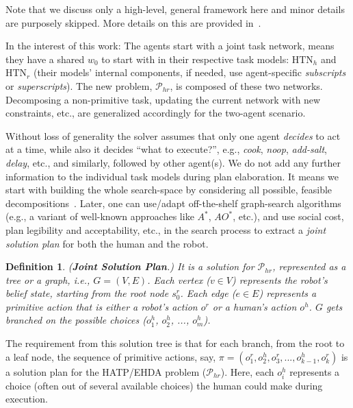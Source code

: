 \documentclass[letterpaper]{article} %
\newtheorem{definition}{Definition}
\begin{document}
Note that we discuss only a high-level, general framework here and minor details are purposely skipped. 
More details on this are provided in~\cite{thesisBuisan21,buisan:hal-03684211}. 

In the interest of this work: The agents start with a joint task network, means they have a shared $w_0$ to start with in their respective task models: $\mathrm{HTN}_{h}$ and $\mathrm{HTN}_{r}$ (their models' internal components, if needed, use agent-specific \textit{subscripts} or \textit{superscripts}). The new problem, $\mathcal{P}_{hr}$, is composed of these two networks. Decomposing a non-primitive task, updating the current network with new constraints, etc., are generalized accordingly for the two-agent scenario. 

Without loss of generality the solver assumes that only one agent \textit{decides} to act at a time, while also it decides ``what to execute?'', e.g., \textit{cook}, \textit{noop}, \textit{add-salt}, \textit{delay}, etc., and similarly, followed by other agent(s). 
We do not add any further information to the individual task models during plan elaboration. It means we start with building the whole search-space by considering all possible, feasible decompositions~\cite{buisan:hal-03684211}. Later, one can use/adapt off-the-shelf graph-search algorithms (e.g., a variant of well-known approaches like $A^*$, $AO^*$, etc.), and use social cost, plan legibility and acceptability, etc., in the search process to extract a \textit{joint solution plan} for both the human and the robot. 

\begin{definition}
(\textbf{Joint Solution Plan}.) 
{It is a solution for $\mathcal{P}_{hr}$, represented as a tree or a graph, i.e., $G=(V,E)$. Each vertex ($v \in V$) represents the robot's belief state, starting from the root node $s_0^r$. Each edge ($e \in E$) represents a primitive action that is either a robot's action $o^{r}$ or a human's action $o^{h}$. $G$ gets branched on the possible choices ($o^{h}_1$, $o^{h}_2$, ..., $o^{h}_m$). 
}  
\end{definition}

The requirement from this solution tree is that for each branch, from the root to a leaf node, the sequence of primitive actions, say,  $\pi=(o_1^r,o_2^h,o_3^r,...,o_{k-1}^h,o_k^r)$ is a solution plan for the HATP/EHDA problem ($\mathcal{P}_{hr}$). Here, each $o_i^h$ represents a choice (often out of several available choices) the human could make during execution.
\end{document}
